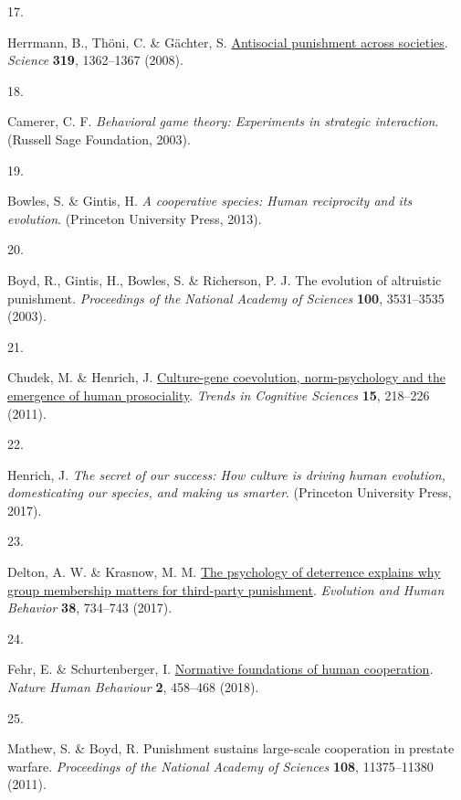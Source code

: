 \documentclass[
  man,floatsintext]{apa6}
\newlength{\cslhangindent}
\newlength{\csllabelwidth}
\newlength{\cslentryspacingunit} %
\newenvironment{CSLReferences}[2] %
 {%
  \setlength{\parindent}{0pt}
  \ifodd #1
  \let\oldpar\par
  \def\par{\hangindent=\cslhangindent\oldpar}
  \fi
  \setlength{\parskip}{#2\cslentryspacingunit}
 }%
 {}
\newcommand{\CSLLeftMargin}[1]{\parbox[t]{\csllabelwidth}{#1}}
\newcommand{\CSLRightInline}[1]{\parbox[t]{\linewidth - \csllabelwidth}{#1}\break}
\begin{document}
\begin{CSLReferences}{0}{0}
\leavevmode{}%
\CSLLeftMargin{17. }%
\CSLRightInline{Herrmann, B., Thöni, C. \& Gächter, S. \href{https://doi.org/10.1126/science.1153808}{Antisocial punishment across societies}. \emph{Science} \textbf{319}, 1362--1367 (2008).}

\leavevmode{}%
\CSLLeftMargin{18. }%
\CSLRightInline{Camerer, C. F. \emph{Behavioral game theory: Experiments in strategic interaction}. (Russell Sage Foundation, 2003).}

\leavevmode{}%
\CSLLeftMargin{19. }%
\CSLRightInline{Bowles, S. \& Gintis, H. \emph{A cooperative species: Human reciprocity and its evolution}. (Princeton University Press, 2013).}

\leavevmode{}%
\CSLLeftMargin{20. }%
\CSLRightInline{Boyd, R., Gintis, H., Bowles, S. \& Richerson, P. J. The evolution of altruistic punishment. \emph{Proceedings of the National Academy of Sciences} \textbf{100}, 3531--3535 (2003).}

\leavevmode{}%
\CSLLeftMargin{21. }%
\CSLRightInline{Chudek, M. \& Henrich, J. \href{https://doi.org/10.1016/j.tics.2011.03.003}{Culture-gene coevolution, norm-psychology and the emergence of human prosociality}. \emph{Trends in Cognitive Sciences} \textbf{15}, 218--226 (2011).}

\leavevmode{}%
\CSLLeftMargin{22. }%
\CSLRightInline{Henrich, J. \emph{The secret of our success: How culture is driving human evolution, domesticating our species, and making us smarter}. (Princeton University Press, 2017).}

\leavevmode{}%
\CSLLeftMargin{23. }%
\CSLRightInline{Delton, A. W. \& Krasnow, M. M. \href{https://doi.org/10.1016/j.evolhumbehav.2017.07.003}{The psychology of deterrence explains why group membership matters for third-party punishment}. \emph{Evolution and Human Behavior} \textbf{38}, 734--743 (2017).}

\leavevmode{}%
\CSLLeftMargin{24. }%
\CSLRightInline{Fehr, E. \& Schurtenberger, I. \href{https://doi.org/10.1038/s41562-018-0385-5}{Normative foundations of human cooperation}. \emph{Nature Human Behaviour} \textbf{2}, 458--468 (2018).}

\leavevmode{}%
\CSLLeftMargin{25. }%
\CSLRightInline{Mathew, S. \& Boyd, R. Punishment sustains large-scale cooperation in prestate warfare. \emph{Proceedings of the National Academy of Sciences} \textbf{108}, 11375--11380 (2011).}


\end{CSLReferences}
\end{document}
